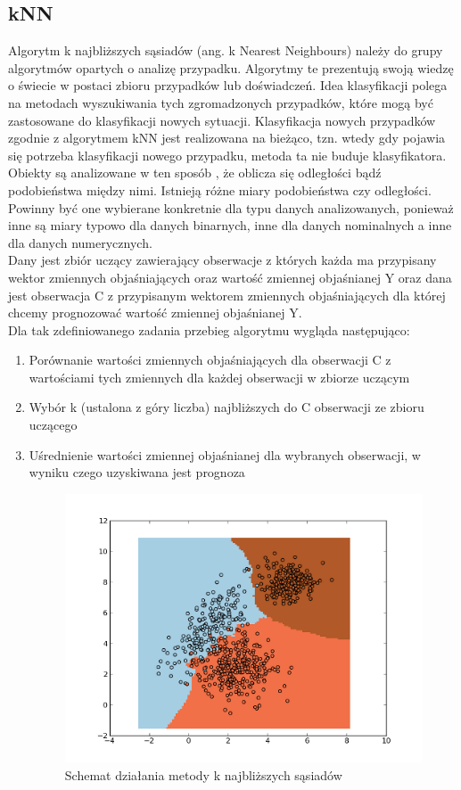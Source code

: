\documentclass{article}
\begin{document}
\subsection{kNN}
Algorytm k najbliższych sąsiadów (ang. k Nearest Neighbours) należy do grupy algorytmów opartych o analizę przypadku. Algorytmy te prezentują swoją wiedzę o świecie w postaci zbioru przypadków lub doświadczeń. Idea klasyfikacji polega na metodach wyszukiwania tych zgromadzonych przypadków, które mogą być zastosowane do klasyfikacji nowych sytuacji. Klasyfikacja nowych przypadków zgodnie z algorytmem kNN jest realizowana na bieżąco, tzn. wtedy gdy pojawia się potrzeba klasyfikacji nowego przypadku, metoda ta nie buduje klasyfikatora. \\
Obiekty są analizowane w ten sposób , że oblicza się odległości bądź podobieństwa między nimi. Istnieją różne miary podobieństwa czy odległości. Powinny być one wybierane konkretnie dla typu danych analizowanych, ponieważ inne są miary typowo dla danych binarnych, inne dla danych nominalnych a inne dla danych numerycznych.\\
Dany jest zbiór uczący zawierający obserwacje z których każda ma przypisany wektor zmiennych objaśniających oraz wartość zmiennej objaśnianej Y oraz dana jest obserwacja C z przypisanym wektorem zmiennych objaśniających dla której chcemy prognozować wartość zmiennej objaśnianej Y.\\
Dla tak zdefiniowanego zadania przebieg algorytmu wygląda następująco:
\begin{enumerate}
\item Porównanie wartości zmiennych objaśniających dla obserwacji C z wartościami tych zmiennych dla każdej obserwacji w zbiorze uczącym
\item Wybór k (ustalona z góry liczba) najbliższych do C obserwacji ze zbioru uczącego
\item Uśrednienie wartości zmiennej objaśnianej dla wybranych obserwacji, w wyniku czego uzyskiwana jest prognoza
\begin{figure}[htp]
	\centering
	\includegraphics[width=1\textwidth]{Figures/knn.png}
	\caption{Schemat działania metody k najbliższych sąsiadów }
\end{figure}
\end{enumerate}
\end{document}
